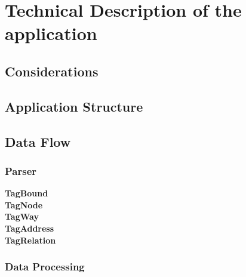 \section{Technical Description of the application}
\subsection{Considerations}
\subsection{Application Structure}
\subsection{Data Flow}
\subsubsection{Parser}
\textbf{TagBound}\\
\textbf{TagNode}\\
\textbf{TagWay}\\
\textbf{TagAddress}\\
\textbf{TagRelation}\\
\subsubsection{Data Processing}
